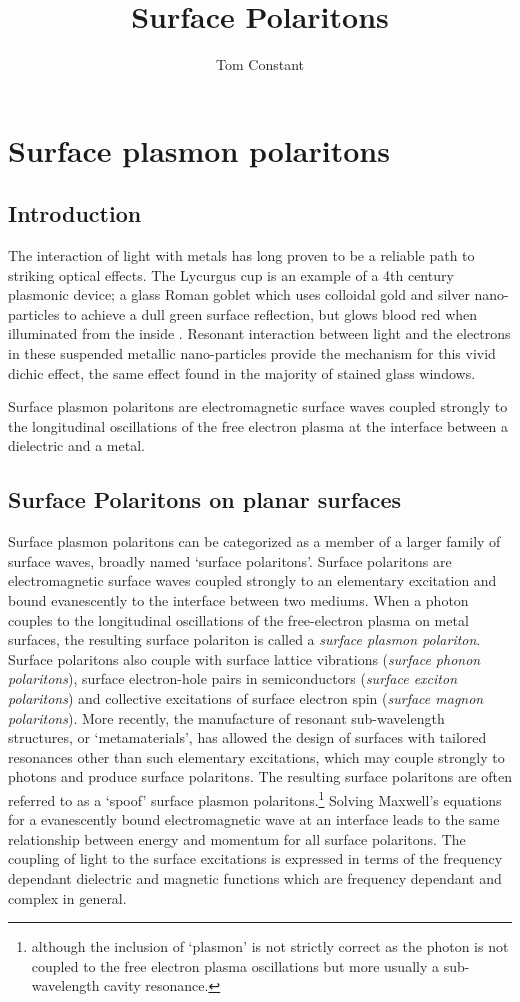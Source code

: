 \documentclass[oneside,10pt,a4paper]{book}
\author{Tom Constant}
\title{Surface Polaritons}
\begin{document}
\chapter{Surface plasmon polaritons} 

\section{Introduction}

The interaction of light with metals has long proven to be a reliable path to striking optical effects.  The Lycurgus cup is an example of a 4th century plasmonic device; a glass Roman goblet which uses colloidal gold and silver nano-particles to achieve a dull green surface reflection, but glows blood red when illuminated from the inside \cite{Barber1990}.  Resonant interaction between light and the electrons in these suspended metallic nano-particles provide the mechanism for this vivid dichic effect, the same effect found in the majority of stained glass windows. 

Surface plasmon polaritons are electromagnetic surface waves coupled strongly to the longitudinal oscillations of the free electron plasma at the interface between a dielectric and a metal. 

\section{Surface Polaritons on planar surfaces}


Surface plasmon polaritons can be categorized as a member of a larger family of surface waves, broadly named `surface polaritons'. Surface polaritons are electromagnetic surface waves coupled strongly to an elementary excitation and bound evanescently to the interface between two mediums. When a photon couples to the longitudinal oscillations of the free-electron plasma on metal surfaces, the resulting surface polariton is called a \textit{surface plasmon polariton}. Surface polaritons also couple with surface lattice vibrations (\textit{surface phonon polaritons}), surface electron-hole pairs in semiconductors (\textit{surface exciton polaritons}) and collective excitations of surface electron spin (\textit{surface magnon polaritons}). More recently, the manufacture of resonant sub-wavelength structures, or `metamaterials', has allowed the design of surfaces with tailored resonances other than such elementary excitations, which may couple strongly to photons and produce surface polaritons. The resulting surface polaritons are often referred to as a `spoof' surface plasmon polaritons.\footnote{although the inclusion of `plasmon' is not strictly correct as the photon is not coupled to the free electron plasma oscillations but more usually a sub-wavelength cavity resonance.}
Solving Maxwell's equations for a evanescently bound electromagnetic wave at an interface leads to the same relationship between energy and momentum for all surface polaritons. The coupling of light to the surface excitations is expressed in terms of the frequency dependant dielectric and magnetic functions which are frequency dependant and complex in general.
\end{document}
